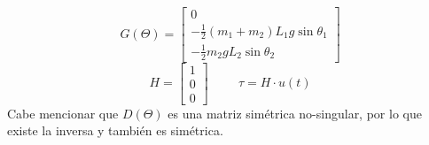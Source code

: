 \begin{equation}
 G\left( \Theta \right) = \begin{bmatrix}
0 \\
 - \frac{1}{2}(m_1+m_2)L_1g\sin\theta_1 \\
- \frac{1}{2}m_2gL_2\sin\theta_2
\end{bmatrix}
\end{equation}
\begin{equation}
 H = \begin{bmatrix}
1 \\
 0 \\
0
\end{bmatrix}
\hspace{1cm}
\tau = H\cdot u(t)
\end{equation}
Cabe mencionar que $D(\Theta)$ es una matriz simétrica no-singular, por lo que existe la inversa y también es simétrica.

%